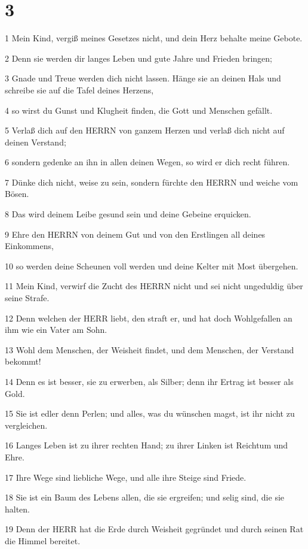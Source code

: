 \chapter{3}

\par 1 Mein Kind, vergiß meines Gesetzes nicht, und dein Herz behalte meine Gebote.
\par 2 Denn sie werden dir langes Leben und gute Jahre und Frieden bringen;
\par 3 Gnade und Treue werden dich nicht lassen. Hänge sie an deinen Hals und schreibe sie auf die Tafel deines Herzens,
\par 4 so wirst du Gunst und Klugheit finden, die Gott und Menschen gefällt.
\par 5 Verlaß dich auf den HERRN von ganzem Herzen und verlaß dich nicht auf deinen Verstand;
\par 6 sondern gedenke an ihn in allen deinen Wegen, so wird er dich recht führen.
\par 7 Dünke dich nicht, weise zu sein, sondern fürchte den HERRN und weiche vom Bösen.
\par 8 Das wird deinem Leibe gesund sein und deine Gebeine erquicken.
\par 9 Ehre den HERRN von deinem Gut und von den Erstlingen all deines Einkommens,
\par 10 so werden deine Scheunen voll werden und deine Kelter mit Most übergehen.
\par 11 Mein Kind, verwirf die Zucht des HERRN nicht und sei nicht ungeduldig über seine Strafe.
\par 12 Denn welchen der HERR liebt, den straft er, und hat doch Wohlgefallen an ihm wie ein Vater am Sohn.
\par 13 Wohl dem Menschen, der Weisheit findet, und dem Menschen, der Verstand bekommt!
\par 14 Denn es ist besser, sie zu erwerben, als Silber; denn ihr Ertrag ist besser als Gold.
\par 15 Sie ist edler denn Perlen; und alles, was du wünschen magst, ist ihr nicht zu vergleichen.
\par 16 Langes Leben ist zu ihrer rechten Hand; zu ihrer Linken ist Reichtum und Ehre.
\par 17 Ihre Wege sind liebliche Wege, und alle ihre Steige sind Friede.
\par 18 Sie ist ein Baum des Lebens allen, die sie ergreifen; und selig sind, die sie halten.
\par 19 Denn der HERR hat die Erde durch Weisheit gegründet und durch seinen Rat die Himmel bereitet.
